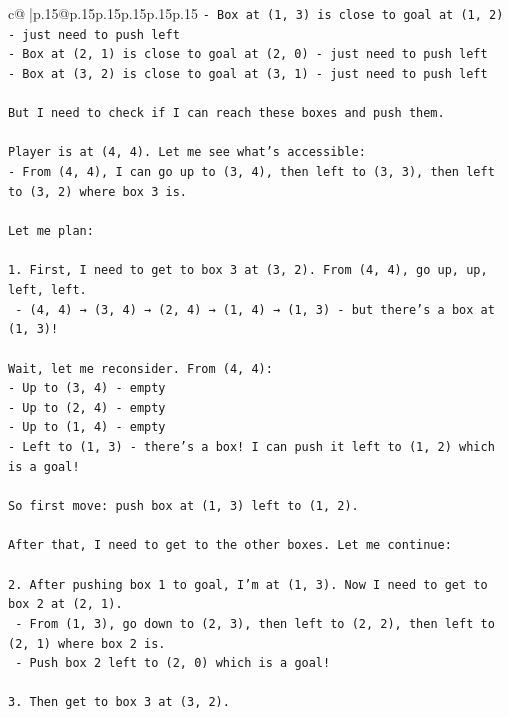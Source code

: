 \documentclass{article}
\begin{document}
{\begin{supertabular}{c@{$\;$}|p{.15\linewidth}@{}p{.15\linewidth}p{.15\linewidth}p{.15\linewidth}p{.15\linewidth}p{.15\linewidth}}
{{{\texttt{{-} Box at (1, 3) is close to goal at (1, 2) {-} just need to push left} \\
\texttt{{-} Box at (2, 1) is close to goal at (2, 0) {-} just need to push left} \\
\texttt{{-} Box at (3, 2) is close to goal at (3, 1) {-} just need to push left} \\
\\ 
\texttt{But I need to check if I can reach these boxes and push them.} \\
\\ 
\texttt{Player is at (4, 4). Let me see what's accessible:} \\
\texttt{{-} From (4, 4), I can go up to (3, 4), then left to (3, 3), then left to (3, 2) where box 3 is.} \\
\\ 
\texttt{Let me plan:} \\
\\ 
\texttt{1. First, I need to get to box 3 at (3, 2). From (4, 4), go up, up, left, left.} \\
\texttt{   {-} (4, 4) → (3, 4) → (2, 4) → (1, 4) → (1, 3) {-} but there's a box at (1, 3)!} \\
\\ 
\texttt{Wait, let me reconsider. From (4, 4):} \\
\texttt{{-} Up to (3, 4) {-} empty} \\
\texttt{{-} Up to (2, 4) {-} empty  } \\
\texttt{{-} Up to (1, 4) {-} empty} \\
\texttt{{-} Left to (1, 3) {-} there's a box! I can push it left to (1, 2) which is a goal!} \\
\\ 
\texttt{So first move: push box at (1, 3) left to (1, 2).} \\
\\ 
\texttt{After that, I need to get to the other boxes. Let me continue:} \\
\\ 
\texttt{2. After pushing box 1 to goal, I'm at (1, 3). Now I need to get to box 2 at (2, 1).} \\
\texttt{   {-} From (1, 3), go down to (2, 3), then left to (2, 2), then left to (2, 1) where box 2 is.} \\
\texttt{   {-} Push box 2 left to (2, 0) which is a goal!} \\
\\ 
\texttt{3. Then get to box 3 at (3, 2).} \\
}}}
\end{supertabular}}
\end{document}
